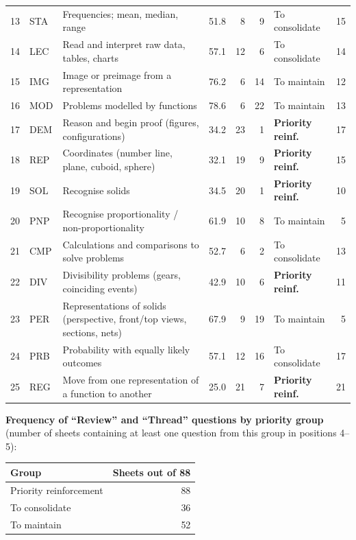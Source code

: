 {\begin{tabular}{@{}l l p{7.6cm} r r r l r@{}}
13 & STA & Frequencies; mean, median, range & 51.8 & 8 & 9 & To consolidate & 15 \\
14 & LEC & Read and interpret raw data, tables, charts & 57.1 & 12 & 6 & To consolidate & 14 \\
15 & IMG & Image or preimage from a representation & 76.2 & 6 & 14 & To maintain & 12 \\
16 & MOD & Problems modelled by functions & 78.6 & 6 & 22 & To maintain & 13 \\
17 & DEM & Reason and begin proof (figures, configurations) & 34.2 & 23 & 1 & \textbf{Priority reinf.} & 17 \\
18 & REP & Coordinates (number line, plane, cuboid, sphere) & 32.1 & 19 & 9 & \textbf{Priority reinf.} & 15 \\
19 & SOL & Recognise solids & 34.5 & 20 & 1 & \textbf{Priority reinf.} & 10 \\
20 & PNP & Recognise proportionality / non-proportionality & 61.9 & 10 & 8 & To maintain & 5 \\
21 & CMP & Calculations and comparisons to solve problems & 52.7 & 6 & 2 & To consolidate & 13 \\
22 & DIV & Divisibility problems (gears, coinciding events) & 42.9 & 10 & 6 & \textbf{Priority reinf.} & 11 \\
23 & PER & Representations of solids (perspective, front/top views, sections, nets) & 67.9 & 9 & 19 & To maintain & 5 \\
24 & PRB & Probability with equally likely outcomes & 57.1 & 12 & 16 & To consolidate & 17 \\
25 & REG & Move from one representation of a function to another & 25.0 & 21 & 7 & \textbf{Priority reinf.} & 21 \\
\bottomrule\end{tabular}}\par\bigskip
\textbf{Frequency of ``Review'' and ``Thread'' questions by priority group} (number of sheets containing at least one question from this group in positions 4–5):\par\smallskip
\begin{tabular}{@{}l r@{}}\toprule Group & Sheets out of 88 \\ \midrule
Priority reinforcement & 88 \\
To consolidate & 36 \\
To maintain & 52 \\
\bottomrule\end{tabular}\par
